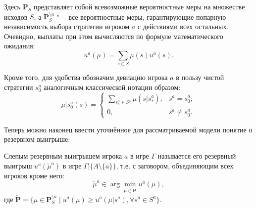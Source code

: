 Здесь $\mathbf{P}_S$ представляет собой всевозможные вероятностные меры на множестве исходов $S$, а $\mathbf{P}_S^{\setminus a}$ "--- все вероятностные меры, гарантирующие попарную независимость выбора стратегии игроком $a$ с действиями всех остальных. Очевидно, выплаты при этом вычисляются по формуле математического ожидания:
\begin{equation*}
	u^a(\mu) = \sum_{s \in S} \mu(s) u^a(s).
\end{equation*}

Кроме того, для удобства обозначим девиацию игрока $a$ в пользу чистой стратегии $s^a_0$ аналогичным классической нотации образом:
\begin{equation*}
	\mu | s^a_0(s) =
	\begin{cases}
		\sum_{s^a_* \in S^a} \mu(s | s^a_*), & s^a = s^a_0; \\
		0, & s^a \neq s^a_0.
	\end{cases}
\end{equation*}

Теперь можно наконец ввести уточнённое для рассматриваемой модели понятие о резервном выигрыше:
\begin{definition}
	Слепым резервным выигрышем игрока $a$ в игре $\Gamma$ называется его резервный выигрыш $u^a(\check{\mu}^a)$ в игре $\Gamma | \{A \setminus \{a\}\}$, т.е. с заговором, объединяющим всех игроков кроме него:
	\begin{equation*}
		\check{\mu}^a \in \arg\min_{\mu \in \check{\mathbf{P}}} u^a(\mu),
	\end{equation*}
	где $\check{\mathbf{P}} = \{\mu \in \mathbf{P}_S^{\setminus a} \mid u^a(\mu) \ge u^a(\mu | s^a), \forall s^a \in S^a\}$.
\end{definition}


